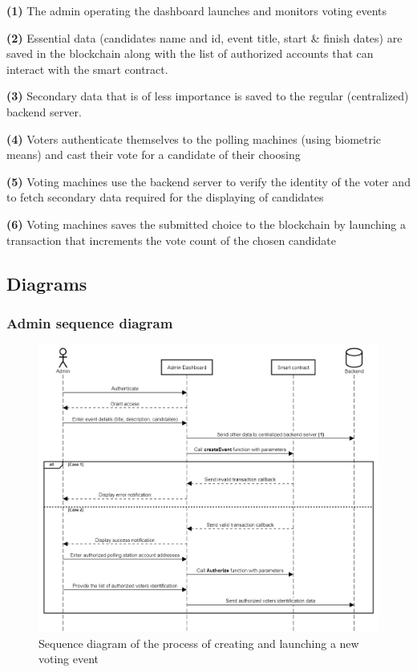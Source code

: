 \begin{list}{}{}
\item \textbf{(1)} The admin operating the dashboard launches and monitors voting events
\item \textbf{(2)} Essential data (candidates name and id, event title, start \& finish dates) are saved in the blockchain along with the list of authorized accounts that can interact with the smart contract.
\item \textbf{(3)} Secondary data that is of less importance is saved to the regular (centralized) backend server.
\item \textbf{(4)} Voters authenticate themselves to the polling machines (using biometric means) and cast their vote for a candidate of their choosing
\item \textbf{(5)} Voting machines use the backend server to verify the identity of the voter and to fetch secondary data required for the displaying of candidates
\item \textbf{(6)} Voting machines saves the submitted choice to the blockchain by launching a transaction that increments the vote count of the chosen candidate
\end{list}

\subsection{Diagrams}
\subsubsection{Admin sequence diagram}

\begin{figure}[H]
	\centering
		\includegraphics[width=14cm]{images/chapter3/admin_sequence_diagram.png}
		\caption{{\footnotesize Sequence diagram of the process of creating and launching a new voting event}}
\end{figure}

